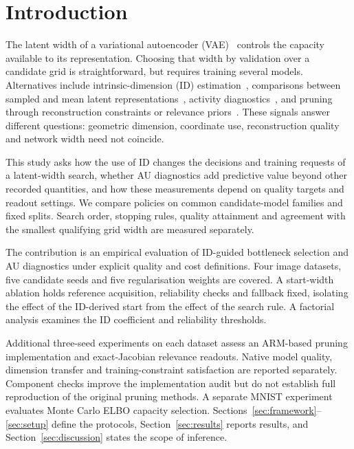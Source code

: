 \section{Introduction}\label{sec:intro}

The latent width of a variational autoencoder (VAE)~\cite{kingma2014vae}
controls the capacity available to its representation. Choosing that width
by validation over a candidate grid is straightforward, but requires
training several models. Alternatives include intrinsic-dimension (ID)
estimation~\cite{facco2017twonn,levina2005mle}, comparisons between sampled
and mean latent representations~\cite{bonheme2022fondue}, activity
diagnostics~\cite{burda2016iwae,bonheme2023active}, and pruning through
reconstruction constraints or relevance priors~\cite{deboom2020geco,saha2025ardvae}.
These signals answer different questions: geometric dimension, coordinate
use, reconstruction quality and network width need not coincide.

This study asks how the use of ID changes the decisions and training
requests of a latent-width search, whether AU diagnostics add predictive
value beyond other recorded quantities, and how these measurements depend
on quality targets and readout settings. We compare policies on common
candidate-model families and fixed splits. Search order, stopping rules,
quality attainment and agreement with the smallest qualifying grid width
are measured separately.

The contribution is an empirical evaluation of ID-guided bottleneck
selection and AU diagnostics under explicit quality and cost definitions.
Four image datasets, five candidate seeds and five regularisation weights
are covered. A start-width ablation holds reference acquisition,
reliability checks and fallback fixed, isolating the effect of the
ID-derived start from the effect of the search rule. A factorial analysis
examines the ID coefficient and reliability thresholds.

Additional three-seed experiments on each dataset assess an ARM-based
pruning implementation and exact-Jacobian relevance readouts. Native
model quality, dimension transfer and training-constraint satisfaction
are reported separately. Component checks improve the implementation
audit but do not establish full reproduction of the original pruning
methods. A separate MNIST experiment evaluates Monte Carlo ELBO capacity
selection. Sections~\ref{sec:framework}--\ref{sec:setup} define the protocols,
Section~\ref{sec:results} reports results, and
Section~\ref{sec:discussion} states the scope of inference.

